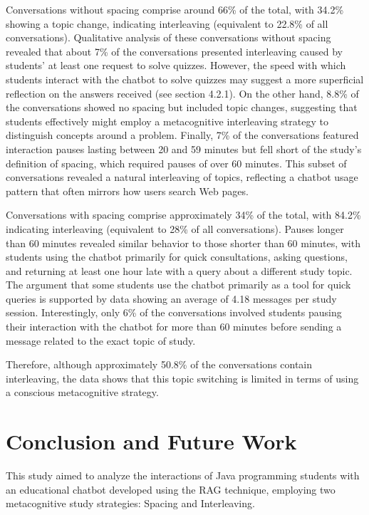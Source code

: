\documentclass[a4paper,twoside]{article}
\begin{document}
Conversations without spacing comprise around 66\% of the total, with 34.2\%
showing a topic change, indicating interleaving (equivalent to 22.8\% of all
conversations). Qualitative analysis of these conversations without spacing
revealed that about 7\% of the conversations presented interleaving caused by
students' at least one request to solve quizzes. However, the speed with which
students interact with the chatbot to solve quizzes may suggest a more
superficial reflection on the answers received (see section 4.2.1). On the other
hand, 8.8\% of the conversations showed no spacing but included topic changes,
suggesting that students effectively might employ a metacognitive interleaving
strategy to distinguish concepts around a problem. Finally, 7\% of the
conversations featured interaction pauses lasting between 20 and 59 minutes but
fell short of the study's definition of spacing, which required pauses of over
60 minutes. This subset of conversations revealed a natural interleaving of
topics, reflecting a chatbot usage pattern that often mirrors how users search
Web pages.

Conversations with spacing comprise approximately 34\% of the total, with 84.2\%
indicating interleaving (equivalent to 28\% of all conversations). Pauses longer
than 60 minutes revealed similar behavior to those shorter than 60 minutes, with
students using the chatbot primarily for quick consultations, asking questions,
and returning at least one hour late with a query about a different study topic.
The argument that some students use the chatbot primarily as a tool for quick
queries is supported by data showing an average of 4.18 messages per study
session. Interestingly, only 6\% of the conversations involved students pausing
their interaction with the chatbot for more than 60 minutes before sending a
message related to the exact topic of study.

Therefore, although approximately 50.8\% of the conversations contain
interleaving, the data shows that this topic switching is limited in terms of
using a conscious metacognitive strategy.

\section{Conclusion and Future Work}

This study aimed to analyze the interactions of Java programming students with
an educational chatbot developed using the RAG technique, employing two
metacognitive study strategies: Spacing and Interleaving.
\end{document}
